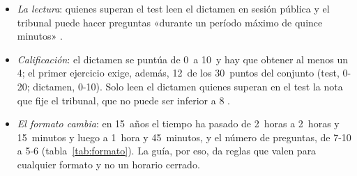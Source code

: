\documentclass[11pt]{article}
\begin{document}
\begin{itemize}
\begin{itemize}
  \item no se puede salir de la sala en los 10~primeros ni en los 10~últimos minutos (para salir, se levanta la mano y se espera a que recojan las hojas);
  \item al anunciarse el final hay que dejar de escribir inmediatamente, también so pena de eliminación;
  \item las hojas se meten en un sobre cerrado, con el nombre delante y la firma por detrás, abarcando la solapa y el sobre, que se abre delante del aspirante el día de su lectura;
  \item tapones sí, cascos no; móviles y dispositivos, apagados y lejos.
  \end{itemize}
\item \emph{La lectura}: quienes superan el test leen el dictamen en sesión pública y el tribunal puede hacer preguntas «durante un período máximo de quince minutos» \parencite{BOE2025ConvocatoriaTCEE}.
\item \emph{Calificación}: el dictamen se puntúa de 0~a 10~y hay que obtener al menos un 4; el primer ejercicio exige, además, 12~de los 30~puntos del conjunto (test, 0-20; dictamen, 0-10). Solo leen el dictamen quienes superan en el test la nota que fije el tribunal, que no puede ser inferior a 8 \parencite{BOE2025ConvocatoriaTCEE}.
\item \emph{El formato cambia}: en 15~años el tiempo ha pasado de 2~horas a 2~horas y 15~minutos y luego a 1~hora y 45~minutos, y el número de preguntas, de 7-10 a 5-6 (tabla~\ref{tab:formato}). La guía, por eso, da reglas que valen para cualquier formato y no un horario cerrado.
\end{itemize}
\end{document}
